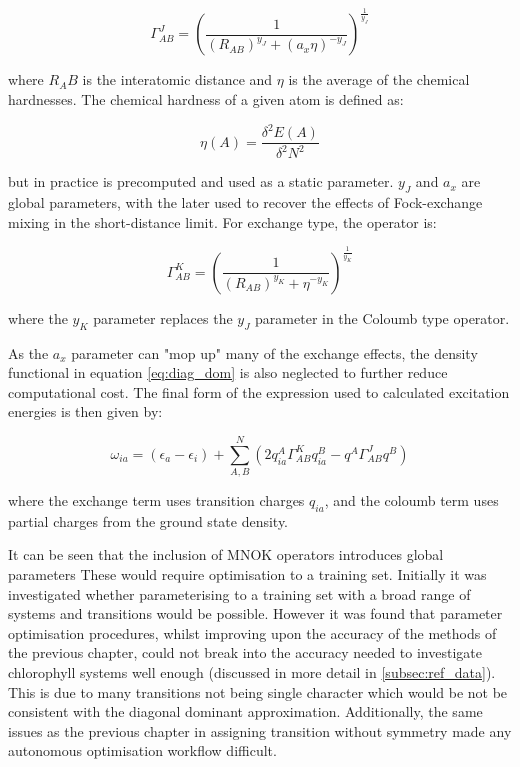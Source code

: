 \begin{equation}
\Gamma^J_{AB} = \left(\frac{1}{\left(R_{AB}\right)^{y_J} + \left(a_x \eta\right)^{-y_J}} \right)^{\frac{1}{y_J}}
\end{equation}

where $R_AB$ is the interatomic distance and $\eta$ is the average of the chemical 
hardnesses. The chemical hardness of a given atom is defined as:

\begin{equation}
\eta\left(A\right) = \frac{\delta^2 E\left(A\right)}{\delta^2 N^2}
\end{equation}

but in practice is precomputed and used as a static parameter. $y_J$ and $a_x$ are
global parameters, with the later used to recover the effects of Fock-exchange mixing
in the short-distance limit. For exchange type, the operator is:

\begin{equation}
\Gamma^K_{AB} = \left(\frac{1}{\left(R_{AB}\right)^{y_K} + \eta^{-y_K}} \right)^{\frac{1}{y_K}}
\end{equation}

where the $y_K$ parameter replaces the $y_J$ parameter in the Coloumb type operator.

As the $a_x$ parameter can "mop up" many of the exchange effects, the density functional
in equation \ref{eq:diag_dom} is also neglected to further reduce computational cost.
The final form of the expression used to calculated excitation energies is then 
given by:

\begin{equation}
\omega_{ia} = \left(\epsilon_a - \epsilon_i\right) + \sum^N_{A,B}\left(2 q_{ia}^A \Gamma^K_{AB} q_{ia}^B - q^A \Gamma^J_{AB} q^B\right)
\end{equation}

where the exchange term uses transition charges $q_{ia}$, and the coloumb term uses
partial charges from the ground state density.

It can be seen that the inclusion of MNOK operators introduces global parameters
These would require optimisation to a training set. Initially it was investigated
whether parameterising to a training set with a broad range of systems and transitions
would be possible. However it was found that parameter optimisation procedures, 
whilst improving upon the accuracy of the \dxtb methods of the previous chapter,
could not break into the accuracy needed to investigate chlorophyll systems well
enough (discussed in more detail in \ref{subsec:ref_data}). This is due to many
transitions not being single character which would be not be consistent with the
diagonal dominant approximation. Additionally, the same issues as the previous 
chapter in assigning transition without symmetry made any autonomous optimisation
workflow difficult.

